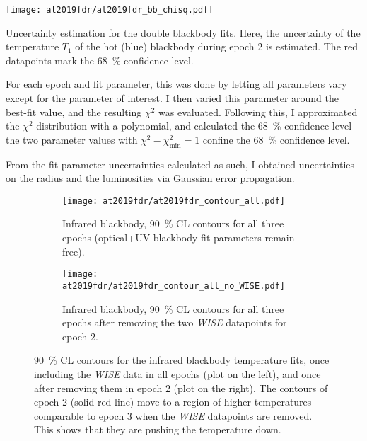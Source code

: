 \begin{marginfigure}
    \texttt{[image: at2019fdr/at2019fdr\_bb\_chisq.pdf]}
    \caption[Uncertainty estimation for double BB fit]{Uncertainty estimation for the double blackbody fits. Here, the uncertainty of the temperature $T_1$ of the hot (blue) blackbody during epoch 2 is estimated. The red datapoints mark the \SI{68}{\percent} confidence level.}
\end{marginfigure}

For each epoch and fit parameter, this was done by letting all parameters vary except for the parameter of interest. I then varied this parameter around the best-fit value, and the resulting $\chi^2$ was evaluated. Following this, I approximated the $\chi^2$ distribution with a polynomial, and calculated the \SI{68}{\percent} confidence level---the two parameter values with $\chi^2 - \chi^2_\text{min} = 1$ confine the \SI{68}{\percent} confidence level.

From the fit parameter uncertainties calculated as such, I obtained uncertainties on the radius and the luminosities via Gaussian error propagation.

\begin{figure}[htb]
    \centering
    \begin{subfigure}{0.48\textwidth}
        \centering
        \texttt{[image: at2019fdr/at2019fdr\_contour\_all.pdf]}
        \caption{Infrared blackbody, \SI{90}{\percent} CL contours for all three epochs (optical+UV blackbody fit parameters remain free).}\label{fig:at2019fdr_contour_all}
    \end{subfigure}
    \hfill
    \begin{subfigure}{0.48\textwidth}
        \centering
        \texttt{[image: at2019fdr/at2019fdr\_contour\_all\_no\_WISE.pdf]}
        \caption{Infrared blackbody, \SI{90}{\percent} CL contours for all three epochs after removing the two \textit{WISE} datapoints for epoch 2.}\label{fig:at2019fdr_contour_all_nowise}
    \end{subfigure}
    \caption[\emph{AT2019fdr} temperature fit]{\SI{90}{\percent} CL contours for the infrared blackbody temperature fits, once including the \textit{WISE} data in all epochs (plot on the left), and once after removing them in epoch 2 (plot on the right). The contours of epoch 2 (solid red line) move to a region of higher temperatures comparable to epoch 3 when the \textit{WISE} datapoints are removed. This shows that they are pushing the temperature down.}\label{fig:at2019fdr_contour}
\end{figure}

